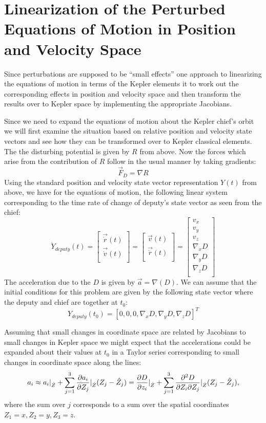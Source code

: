 \section{Linearization of the Perturbed Equations of Motion in Position and Velocity Space}

Since perturbations are supposed to be ``small effects'' one approach to linearizing the equations of motion in terms of the Kepler elements it to work out the corresponding effects in
position and velocity space and then transform the results over to Kepler space by implementing the appropriate Jacobians. 

Since we need to expand the equations of motion about the Kepler chief's orbit we will first examine the situation based on relative position and velocity state vectors and see how they can be transformed over to Kepler classical elements.
The the disturbing potential is given by $R$ from above. Now the forces which arise from the contribution of $R$ follow in the usual manner by taking gradients:
$$\vec{F}_D = \nabla R$$Using the standard position and velocity state vector representation $Y(t)$ from above, we have for the equations of motion, the following linear system corresponding to the time rate of change of deputy's state vector as seen from the chief: 
$$\dot Y_{deputy}(t) = 
\begin{bmatrix}
\vec{\dot r}(t)\\
\vec{\dot v}(t)\\
\end{bmatrix} =
\begin{bmatrix}
\vec{v}(t)\\
\vec{\ddot r}(t)\\
\end{bmatrix} = 
\begin{bmatrix}
v_x\\
v_y\\
v_z\\
\nabla_x D\\
\nabla_y D\\
\nabla_z D\\
\end{bmatrix}
$$
The acceleration due to the $D$ is given by $\vec{a} = \nabla(D)$.
We can assume that the initial conditions for this problem are given by the following state vector where the deputy and chief are together at $t_0$:
$$Y_{deputy}(t_0) =  [0, 0, 0, \nabla_xD, \nabla_yD, \nabla_zD]^T$$

Assuming that small changes in coordinate space are related by Jacobians to small changes in Kepler space we might expect 
that the accelerations could be expanded about their values at $t_0$ in a Taylor series corresponding to small changes in coordinate space along the lines: 
$$a_i \approx a_i|_{\hat Z} + \sum_{j=1}^3{\partial a_i\over \partial Z_j}|_{\hat{Z}}(Z_j - \hat{Z}_j) 
= {\partial D\over\partial z_i}|_{\hat Z} + \sum_{j=1}^3{\partial^2 D\over \partial Z_i \partial Z_j}|_{\hat{Z}}(Z_j - \hat{Z}_j),$$
where the sum over $j$ corresponds to a sum over the spatial coordinates $Z_1 = x, Z_2 = y, Z_3 = z$. \\

